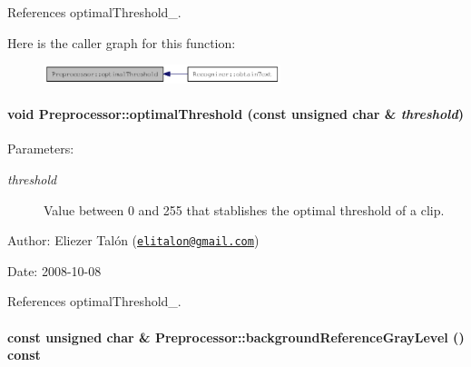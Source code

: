 References optimalThreshold\_\-.

Here is the caller graph for this function:\nopagebreak
\begin{figure}[H]
\begin{center}
\leavevmode
\includegraphics[width=196pt]{class_preprocessor_a44dff024a5b29752780bd4aa0d53d81_icgraph}
\end{center}
\end{figure}
\hypertarget{class_preprocessor_1fc44d7d19944f3c3addd3a576c37414}{
\paragraph[optimalThreshold]{\setlength{\rightskip}{0pt plus 5cm}void Preprocessor::optimalThreshold (const unsigned char \& {\em threshold})}\hfill}
\label{class_preprocessor_1fc44d7d19944f3c3addd3a576c37414}


\begin{Desc}
\item[Parameters:]
\begin{description}
\item[{\em threshold}]Value between 0 and 255 that stablishes the optimal threshold of a clip.\end{description}
\end{Desc}
\begin{Desc}
\item[Author:]Eliezer Talón (\href{mailto:elitalon@gmail.com}{\tt elitalon@gmail.com}) \end{Desc}
\begin{Desc}
\item[Date:]2008-10-08 \end{Desc}


References optimalThreshold\_\-.\hypertarget{class_preprocessor_b435116619b7b254d9e788476c012e8a}{
\paragraph[backgroundReferenceGrayLevel]{\setlength{\rightskip}{0pt plus 5cm}const unsigned char \& Preprocessor::backgroundReferenceGrayLevel () const}\hfill}
\label{class_preprocessor_b435116619b7b254d9e788476c012e8a}


